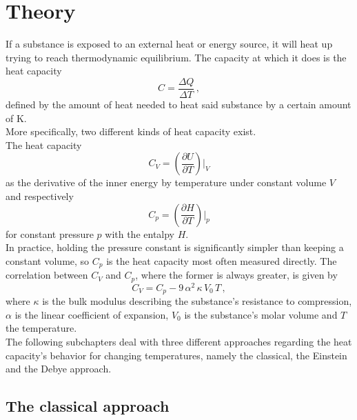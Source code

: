 \section{Theory}
\label{sec:theorie}

If a substance is exposed to an external heat or energy source,
it will heat up trying to reach thermodynamic equilibrium.
The capacity at which it does is the heat capacity
\begin{equation}
    C = \frac{\Delta Q}{\Delta T} \,,
    \label{eq:heat_cap}
\end{equation}
defined by the amount of heat needed to heat said substance by a certain amount of
$\si{\kelvin}$. \\

More specifically, two different kinds of heat capacity exist. \\
The heat capacity 
\begin{equation*}
    C_{V} = \left( \frac{\partial U}{\partial T} \right) \big \vert _V
\end{equation*}
as the derivative of the inner energy by temperature under constant volume $V$ and respectively
\begin{equation*}
    C_{p} = \left( \frac{\partial H}{\partial T} \right) \big \vert _p
\end{equation*}
for constant pressure $p$ with the entalpy $H$. \\

In practice, holding the pressure constant is significantly simpler than keeping a constant volume, so $C_p$ is the heat capacity most often measured directly.
The correlation between $C_V$ and $C_p$, where the former is always greater, is given by
\begin{equation}
    C_V = C_p - 9 \, \alpha^2 \, \kappa \, V_0 \, T \,,
    \label{eq:CVtoCp}
\end{equation}
where $ \kappa $ is the bulk modulus describing the substance's resistance to compression, $\alpha$ is the linear coefficient of expansion, $V_0$ is the substance's molar volume and $T$ the temperature. \\

The following subchapters deal with three different approaches regarding the heat capacity's behavior for changing temperatures, namely the classical, the Einstein and the Debye approach.

\subsection{The classical approach}

